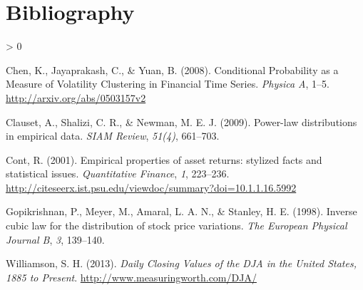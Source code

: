 \documentclass[
  11pt,
]{article}
\newlength{\cslhangindent}
\newenvironment{CSLReferences}[2] %
 {%
  \setlength{\parindent}{0pt}
  \ifodd #1 \everypar{\setlength{\hangindent}{\cslhangindent}}\ignorespaces\fi
  \ifnum #2 > 0
  \setlength{\parskip}{#2\baselineskip}
  \fi
 }%
 {}
\begin{document}
\hypertarget{bibliography}{%
\section*{Bibliography}\label{bibliography}}

\hypertarget{refs}{}
\begin{CSLReferences}{1}{0}
\leavevmode\hypertarget{ref-Chen-2008}{}%
Chen, K., Jayaprakash, C., \& Yuan, B. (2008). {Conditional Probability as a Measure of Volatility Clustering in Financial Time Series}. \emph{Physica A}, 1--5. \url{http://arxiv.org/abs/0503157v2}

\leavevmode\hypertarget{ref-Clauset2009}{}%
Clauset, A., Shalizi, C. R., \& Newman, M. E. J. (2009). {Power-law distributions in empirical data}. \emph{SIAM Review}, \emph{51(4)}, 661--703.

\leavevmode\hypertarget{ref-Cont2001}{}%
Cont, R. (2001). {Empirical properties of asset returns: stylized facts and statistical issues}. \emph{Quantitative Finance}, \emph{1}, 223--236. \url{http://citeseerx.ist.psu.edu/viewdoc/summary?doi=10.1.1.16.5992}

\leavevmode\hypertarget{ref-Gopikrishnana1998}{}%
Gopikrishnan, P., Meyer, M., Amaral, L. A. N., \& Stanley, H. E. (1998). {Inverse cubic law for the distribution of stock price variations}. \emph{The European Physical Journal B}, \emph{3}, 139--140.

\leavevmode\hypertarget{ref-Williamson2013}{}%
Williamson, S. H. (2013). \emph{{Daily Closing Values of the DJA in the United States, 1885 to Present}}. \url{http://www.measuringworth.com/DJA/}

\end{CSLReferences}
\end{document}
